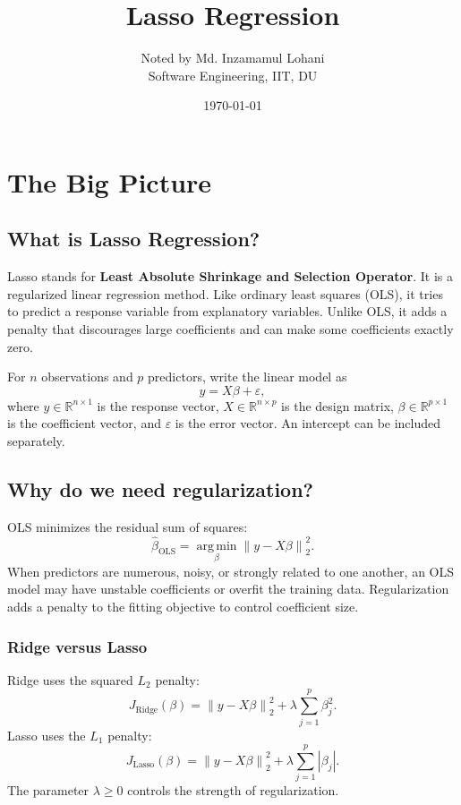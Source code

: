 \documentclass[11pt,a4paper,oneside]{book}
\title{\Huge\bfseries Lasso Regression\\[0.2em]}
\author{Noted by Md. Inzamamul Lohani\\
Software Engineering, IIT, DU}
\date{\today}
\newcommand{\RR}{\mathbb{R}}
\newcommand{\norm}[1]{\left\lVert #1\right\rVert}
\newcommand{\abs}[1]{\left|#1\right|}
\newcommand{\argmin}{\operatorname*{arg\,min}}
\begin{document}
\hypersetup{pageanchor=false}
\maketitle
\hypersetup{pageanchor=true}
\frontmatter

\tableofcontents
\mainmatter

\chapter{The Big Picture}
\section{What is Lasso Regression?}
Lasso stands for \textbf{Least Absolute Shrinkage and Selection Operator}. It is a regularized linear regression method. Like ordinary least squares (OLS), it tries to predict a response variable from explanatory variables. Unlike OLS, it adds a penalty that discourages large coefficients and can make some coefficients exactly zero.

For $n$ observations and $p$ predictors, write the linear model as
\begin{equation}
  y=X\beta+\varepsilon,
\end{equation}
where $y\in\RR^{n\times1}$ is the response vector, $X\in\RR^{n\times p}$ is the design matrix, $\beta\in\RR^{p\times1}$ is the coefficient vector, and $\varepsilon$ is the error vector. An intercept can be included separately.

\section{Why do we need regularization?}
OLS minimizes the residual sum of squares:
\begin{equation}
  \hat\beta_{\mathrm{OLS}}=\argmin_\beta \norm{y-X\beta}_2^2.
\end{equation}
When predictors are numerous, noisy, or strongly related to one another, an OLS model may have unstable coefficients or overfit the training data. Regularization adds a penalty to the fitting objective to control coefficient size.

\subsection{Ridge versus Lasso}
Ridge uses the squared $L_2$ penalty:
\begin{equation}
  J_{\mathrm{Ridge}}(\beta)=\norm{y-X\beta}_2^2+\lambda\sum_{j=1}^p\beta_j^2.
\end{equation}
Lasso uses the $L_1$ penalty:
\begin{equation}
  \boxed{J_{\mathrm{Lasso}}(\beta)=\norm{y-X\beta}_2^2+\lambda\sum_{j=1}^p\abs{\beta_j}.}
  \label{eq:lasso-objective}
\end{equation}
The parameter $\lambda\geq0$ controls the strength of regularization.
\end{document}
